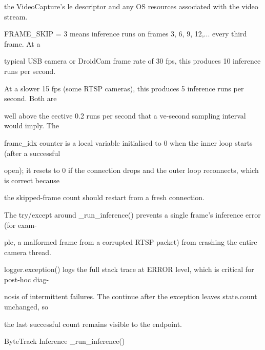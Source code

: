the VideoCapture's le descriptor and any OS resources associated with the video stream.

FRAME\_SKIP = 3 means inference runs on frames 3, 6, 9, 12,...  every third frame. At a

typical USB camera or DroidCam frame rate of 30 fps, this produces 10 inference runs per second.

At a slower 15 fps (some RTSP cameras), this produces 5 inference runs per second. Both are

well above the eective 0.2 runs per second that a ve-second sampling interval would imply. The

frame\_idx counter is a local variable initialised to 0 when the inner loop starts (after a successful

open); it resets to 0 if the connection drops and the outer loop reconnects, which is correct because

the skipped-frame count should restart from a fresh connection.

The try/except around \_run\_inference() prevents a single frame's inference error (for exam-

ple, a malformed frame from a corrupted RTSP packet) from crashing the entire camera thread.

logger.exception() logs the full stack trace at ERROR level, which is critical for post-hoc diag-

nosis of intermittent failures. The continue after the exception leaves state.count unchanged, so

the last successful count remains visible to the endpoint.

ByteTrack Inference  \_run\_inference()

